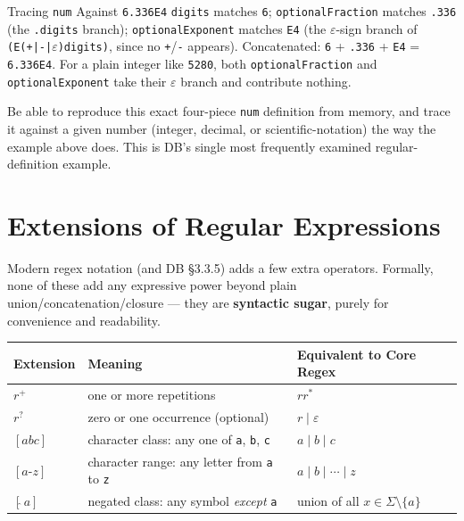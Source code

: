 \documentclass[full-course-notes.tex]{subfiles}
\begin{document}
\begin{examplebox}{Tracing \texttt{num} Against \texttt{6.336E4}}
\texttt{digits} matches \texttt{6}; \texttt{optionalFraction} matches \texttt{.336} (the
\texttt{.digits} branch); \texttt{optionalExponent} matches \texttt{E4} (the
$\varepsilon$-sign branch of \texttt{(E(+|-|}$\varepsilon$\texttt{)digits)}, since no
\texttt{+}/\texttt{-} appears). Concatenated: \texttt{6} + \texttt{.336} + \texttt{E4} =
\texttt{6.336E4}. For a plain integer like \texttt{5280}, both \texttt{optionalFraction} and
\texttt{optionalExponent} take their $\varepsilon$ branch and contribute nothing.
\end{examplebox}

\begin{examfocus}
Be able to reproduce this exact four-piece \texttt{num} definition from memory, and trace it
against a given number (integer, decimal, or scientific-notation) the way the example above
does. This is DB's single most frequently examined regular-definition example.
\end{examfocus}

\section{Extensions of Regular Expressions}
\label{sec:l4-extensions}

\beyonddb Modern regex notation (and DB \S3.3.5) adds a few extra operators. Formally, none of
these add any expressive power beyond plain union/concatenation/closure --- they are
\textbf{syntactic sugar}, purely for convenience and readability.

\begin{center}
\renewcommand{\arraystretch}{1.4}
\begin{tabularx}{\textwidth}{@{}l l X@{}}
\toprule
\textbf{Extension} & \textbf{Meaning} & \textbf{Equivalent to Core Regex} \\
\midrule
$r^{+}$ & one or more repetitions & $rr^{*}$ \\
$r^{?}$ & zero or one occurrence (optional) & $r \mid \varepsilon$ \\
$[abc]$ & character class: any one of \texttt{a}, \texttt{b}, \texttt{c} & $a \mid b \mid c$ \\
$[a\text{-}z]$ & character range: any letter from \texttt{a} to \texttt{z} & $a \mid b \mid
\cdots \mid z$ \\
$[\hat{}\,a]$ & negated class: any symbol \emph{except} \texttt{a} & union of all $x \in \Sigma
\setminus \{a\}$ \\
\bottomrule
\end{tabularx}
\end{center}
\end{document}

